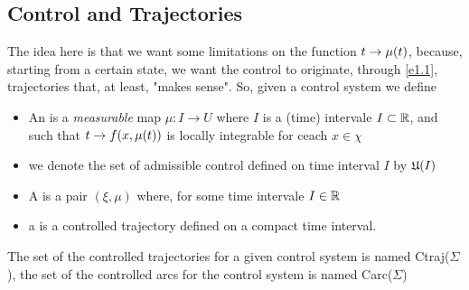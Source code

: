\subsection{Control and Trajectories}
The idea here is that we want some limitations on the function $t\rightarrow\mu(t)$, because, starting from a certain state, we want the control to originate, through \ref{e1.1}, trajectories that, at least, "makes sense". So, given a control system \controlSystem  we define\\
\begin{itemize}
	\item An  is a \textit{measurable} map $\mu:I\rightarrow U$ where $I$ is a (time) intervale $I\subset\mathbb{R}$, and such that $t\rightarrow f(x,\mu(t) )$ is locally integrable for ceach $x\in\chi$
	\item we denote the set of admissible control defined on time interval $I$ by $\mathfrak{U}(I)$	
	\item A  is a pair $(\xi,\mu)$ where, for some time intervale $I\in\mathbb{R}$
	\item a  is a controlled trajectory defined on a compact time interval.
\end{itemize}
The set of the controlled trajectories for a given control system \controlSystem is named Ctraj($\Sigma$), the set of the controlled arcs for the control system is named Carc($\Sigma$)


